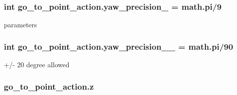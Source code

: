 \subsubsection[{\texorpdfstring{yaw\+\_\+precision\+\_\+}{yaw_precision_}}]{\setlength{\rightskip}{0pt plus 5cm}int go\+\_\+to\+\_\+point\+\_\+action.\+yaw\+\_\+precision\+\_\+ = math.\+pi/9}\hypertarget{namespacego__to__point__action_a914253ff638fc05f3f0fd3d9536503c2}{}\label{namespacego__to__point__action_a914253ff638fc05f3f0fd3d9536503c2}


parameters 

\subsubsection[{\texorpdfstring{yaw\+\_\+precision\+\_\+2\+\_\+}{yaw_precision_2_}}]{\setlength{\rightskip}{0pt plus 5cm}int go\+\_\+to\+\_\+point\+\_\+action.\+yaw\+\_\+precision\+\_\+\_\+ = math.\+pi/90}\hypertarget{namespacego__to__point__action_a65f4bbc971a7e33d9441aa79dcbfa1ae}{}\label{namespacego__to__point__action_a65f4bbc971a7e33d9441aa79dcbfa1ae}


+/-\/ 20 degree allowed 

\subsubsection[{\texorpdfstring{z}{z}}]{\setlength{\rightskip}{0pt plus 5cm}go\+\_\+to\+\_\+point\+\_\+action.\+z}\hypertarget{namespacego__to__point__action_a8848541ff0d9e1607e1d715de007aa03}{}\label{namespacego__to__point__action_a8848541ff0d9e1607e1d715de007aa03}
